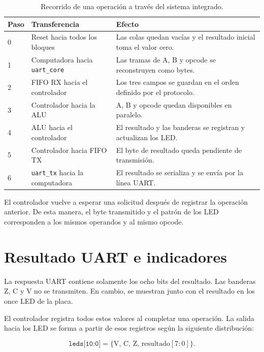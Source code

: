 \begin{table}[H]
  \centering
  \begin{tabularx}{0.96\textwidth}{C{1.1cm}L{4.2cm}Y}
    \toprule
    \textbf{Paso} & \textbf{Transferencia} & \textbf{Efecto} \\
     & Reset hacia todos los bloques &
    Las colas quedan vacías y el resultado inicial toma el valor cero. \\
    1 & Computadora hacia \texttt{uart\_core} &
    Las tramas de A, B y opcode se reconstruyen como bytes. \\
    2 & FIFO RX hacia el controlador &
    Los tres campos se guardan en el orden definido por el protocolo. \\
    3 & Controlador hacia la ALU &
    A, B y opcode quedan disponibles en paralelo. \\
    4 & ALU hacia el controlador &
    El resultado y las banderas se registran y actualizan los LED. \\
    5 & Controlador hacia FIFO TX &
    El byte de resultado queda pendiente de transmisión. \\
    6 & \texttt{uart\_tx} hacia la computadora &
    El resultado se serializa y se envía por la línea UART. \\
    \bottomrule
  \end{tabularx}
  \caption{Recorrido de una operación a través del sistema integrado.}%
  \label{tab:secuencia-operacion}
\end{table}

El controlador vuelve a esperar una solicitud después de registrar la
operación anterior. De esta manera, el byte transmitido y el patrón
de los LED corresponden a los mismos operandos y al mismo opcode.

\section{Resultado UART e indicadores}

La respuesta UART contiene solamente los ocho bits del resultado. Las
banderas Z, C y V no se transmiten. En cambio, se muestran junto con
el resultado en los once LED de la placa.

El controlador registra todos estos valores al completar una
operación. La salida hacia los LED se forma a partir de esos
registros según la siguiente distribución:

\begin{equation}
  \texttt{leds[10:0]} =
  \{\mathrm{V},\,\mathrm{C},\,\mathrm{Z},\,\mathrm{resultado[7:0]}\}.
\end{equation}


